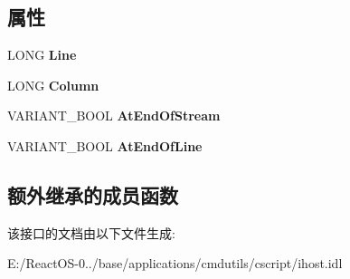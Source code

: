 \subsection*{属性}
\begin{DoxyCompactItemize}
\item 
\mbox{\label{interface_i_host_1_1_i_text_stream_a4cefd07748bb8bafe2420f4d9f553a87}} 
L\+O\+NG {\bfseries Line}
\item 
\mbox{\label{interface_i_host_1_1_i_text_stream_a433d78d5d7be6b1a674a5d8cf6141a8d}} 
L\+O\+NG {\bfseries Column}
\item 
\mbox{\label{interface_i_host_1_1_i_text_stream_a23e3b70745de9c61a054fa64c677a889}} 
V\+A\+R\+I\+A\+N\+T\+\_\+\+B\+O\+OL {\bfseries At\+End\+Of\+Stream}
\item 
\mbox{\label{interface_i_host_1_1_i_text_stream_aa2f33d11dee1da2a5ce76c178deb6e97}} 
V\+A\+R\+I\+A\+N\+T\+\_\+\+B\+O\+OL {\bfseries At\+End\+Of\+Line}
\end{DoxyCompactItemize}
\subsection*{额外继承的成员函数}


该接口的文档由以下文件生成\+:\begin{DoxyCompactItemize}
\item 
E\+:/\+React\+O\+S-\/0../base/applications/cmdutils/cscript/ihost.\+idl\end{DoxyCompactItemize}
